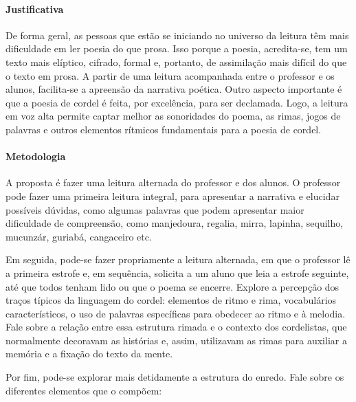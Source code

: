 \documentclass[11pt]{extarticle}
\begin{document}
\paragraph{Justificativa} De forma geral, as pessoas que estão se iniciando no universo da leitura têm mais dificuldade em ler poesia do que prosa. Isso porque a poesia, acredita-se, tem um texto mais elíptico, cifrado, formal e, portanto, de assimilação mais difícil do que o texto em prosa. A partir de uma leitura acompanhada entre o professor e os alunos, facilita-se a apreensão da narrativa poética. Outro aspecto importante é que a poesia de cordel é feita, por excelência, para ser declamada. Logo, a leitura em voz alta permite captar melhor as sonoridades do poema, as rimas, jogos de palavras e outros elementos rítmicos fundamentais para a poesia de cordel.

\paragraph{Metodologia} A proposta é fazer uma leitura alternada do professor e dos alunos. O professor pode fazer uma primeira leitura integral, para apresentar a narrativa e elucidar possíveis dúvidas, como algumas palavras que podem apresentar maior dificuldade de compreensão, como manjedoura, regalia, mirra, lapinha, sequilho, mucunzár, guriabá, cangaceiro etc. 

Em seguida, pode-se fazer propriamente a leitura alternada, em que o professor lê a primeira estrofe e, em sequência, solicita a um aluno que leia a estrofe seguinte, até que todos tenham lido ou que o poema se encerre.
Explore a percepção dos traços típicos da linguagem do cordel: elementos de ritmo e rima, vocabulários característicos, o uso de palavras específicas para obedecer ao ritmo e à melodia. Fale sobre a relação entre essa estrutura rimada e o contexto dos cordelistas, que normalmente decoravam as histórias e, assim, utilizavam as rimas para auxiliar a memória e a fixação do texto da mente.

Por fim, pode-se explorar mais detidamente a estrutura do enredo. Fale sobre os diferentes elementos que o compõem:
\end{document}
